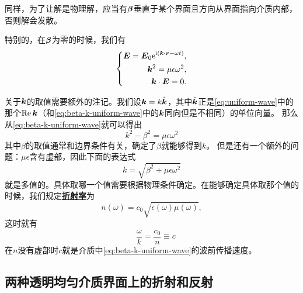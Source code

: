 \documentclass[UTF8, a4paper]{ctexart}
\newcommand*{\ii}{\mathrm{i}}
\newcommand*{\ee}{\mathrm{e}}
\newcommand*{\concept}[1]{\underline{\textbf{#1}}}
\begin{document}
同样，为了让解是物理解，应当有$\vb*{\beta}$垂直于某个界面且方向从界面指向介质内部，否则解会发散。

特别的，在$\vb*{\beta}$为零的时候，我们有
\begin{equation}
    \left\{
        \begin{aligned}
            \vb*{E} = \vb*{E}_0 \ee^{\ii(\vb*{k} \cdot \vb*{r} - \omega t)}, \\
            \vb*{k}^2 = \mu\epsilon \omega^2, \\
            \vb*{k} \cdot \vb*{E} = 0.
        \end{aligned}
    \right.
    \label{eq:beta-zero-uniform-wave}
\end{equation}

关于$\vb*{k}$的取值需要额外的注记。我们设$\vb*{k}=k \hat{\vb*{k}}$，其中$\hat{\vb*{k}}$正是\eqref{eq:uniform-wave}中的那个$\Re\vb*{k}$（和\eqref{eq:beta-k-uniform-wave}中的$\vb*{k}$同向但是不相同）的单位向量。
那么从\eqref{eq:beta-k-uniform-wave}就可以得出
\begin{equation}
    k^2 - \beta^2 = \mu \epsilon \omega^2
\end{equation}
其中$\beta$的取值通常和边界条件有关，确定了$\beta$就能够得到$k$。
但是还有一个额外的问题：$\mu \epsilon$含有虚部，因此下面的表达式
\[
    k = \sqrt{\beta^2 + \mu \epsilon \omega^2}
\]
就是多值的。具体取哪一个值需要根据物理条件确定。在能够确定具体取那个值的时候，我们规定\concept{折射率}为
\begin{equation}
    n(\omega) = c_0 \sqrt{\epsilon(\omega) \mu(\omega)}, 
    \label{eq:refractivity}
\end{equation}
这时就有
\begin{equation}
    \quad \frac{\omega}{k} = \frac{c_0}{n} \equiv c
    \label{eq:k-and-omega-and-n}
\end{equation}
在$n$没有虚部时$c$就是介质中\eqref{eq:beta-k-uniform-wave}的波前传播速度。

\subsection{两种透明均匀介质界面上的折射和反射}\label{sec:two-isotrophy-surface}
\end{document}
